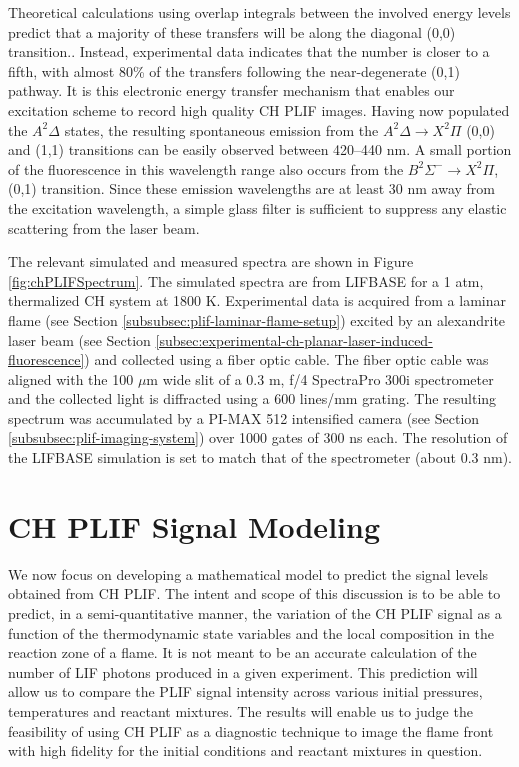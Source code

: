 Theoretical calculations using overlap integrals between the involved energy levels predict that a majority of these transfers will be along the diagonal (0,0) transition.\cite{2000-luque}.
Instead, experimental data indicates that the number is closer to a fifth, with almost 80\% of the transfers following the near-degenerate (0,1) pathway.
It is this electronic energy transfer mechanism that enables our excitation scheme to record high quality CH PLIF images.
Having now populated the \(A^2\Delta\) states, the resulting spontaneous emission from the \(A^2\Delta\rightarrow X^2\Pi\) (0,0) and (1,1) transitions can be easily observed between 420--440 nm.
A small portion of the fluorescence in this wavelength range also occurs from the \(B^2\Sigma^-\rightarrow X^2\Pi\), (0,1) transition.
Since these emission wavelengths are at least 30 nm away from the excitation wavelength, a simple glass filter is sufficient to suppress any elastic scattering from the laser beam.



The relevant simulated and measured spectra are shown in Figure \ref{fig:chPLIFSpectrum}.
The simulated spectra are from LIFBASE for a 1 atm, thermalized CH system at 1800 K.
Experimental data is acquired from a laminar flame (see Section \ref{subsubsec:plif-laminar-flame-setup}) excited by an alexandrite laser beam (see Section \ref{subsec:experimental-ch-planar-laser-induced-fluorescence}) and collected using a fiber optic cable.
The fiber optic cable was aligned with the 100 \(\mu\)m wide slit of a 0.3 m, f/4 SpectraPro 300i spectrometer and the collected light is diffracted using a 600 lines/mm grating.
The resulting spectrum was accumulated by a PI-MAX 512 intensified camera (see Section \ref{subsubsec:plif-imaging-system}) over 1000 gates of 300 ns each.
The resolution of the LIFBASE simulation is set to match that of the spectrometer (about 0.3 nm).

\section{CH PLIF Signal Modeling}
\label{sec:background-chplif-signal-modeling}

We now focus on developing a mathematical model to predict the signal levels obtained from CH PLIF.
The intent and scope of this discussion is to be able to predict, in a semi-quantitative manner, the variation of the CH PLIF signal as a function of the thermodynamic state variables and the local composition in the reaction zone of a flame.
It is not meant to be an accurate calculation of the number of LIF photons produced in a given experiment.
This prediction will allow us to compare the PLIF signal intensity across various initial pressures, temperatures and reactant mixtures.
The results will enable us to judge the feasibility of using CH PLIF as a diagnostic technique to image the flame front with high fidelity for the initial conditions and reactant mixtures in question.

